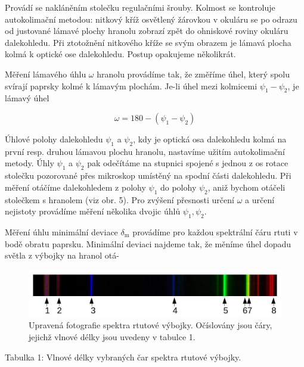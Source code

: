 \documentclass[czech,11pt,a4paper]{article}
\begin{document}
\begin{multicols}{2}
Provádí se nakláněním stolečku regulačními šrouby. Kolmost se kontroluje autokolimační metodou: nitkový kříž osvětlený žárovkou v okuláru se po odrazu od justované lámavé plochy hranolu zobrazí zpět do ohniskové roviny okuláru dalekohledu. Při ztotožnění nitkového kříže se svým obrazem je lámavá plocha kolmá k optické ose dalekohledu. Postup opakujeme několikrát.

Měření lámavého úhlu $\omega$ hranolu provádíme tak, že změříme úhel, který spolu svírají paprsky kolmé k lámavým plochám. Je-li úhel mezi kolmicemi $\psi_{1}-\psi_{2}$, je lámavý úhel

\begin{equation}
	\omega=180-\left(\psi_{1}-\psi_{2}\right)
\end{equation}


Úhlové polohy dalekohledu $\psi_{1}$ a $\psi_{2}$, kdy je optická osa dalekohledu kolmá na první resp. druhou lámavou plochu hranolu, nastavíme užitím autokolimační metody. Úhly $\psi_{1}$ a $\psi_{2}$ pak odečítáme na stupnici spojené s jednou z os rotace stolečku pozorované přes mikroskop umístěný na spodní části dalekohledu. Při měření otáčíme dalekohledem z polohy $\psi_{1}$ do polohy $\psi_{2}$, aniž bychom otáčeli stolečkem s hranolem (viz obr. 5). Pro zvýšení přesnosti určení $\omega$ a určení nejistoty provádíme měření několika dvojic úhlů $\psi_{1}, \psi_{2}$.

Měření úhlu minimální deviace $\delta_{\mathrm{m}}$ provádíme pro každou spektrální čáru rtuti v bodě obratu paprsku. Minimální deviaci najdeme tak, že měníme úhel dopadu světla z výbojky na hranol otá-\\

\begin{figure}[H]
	\includegraphics[max width=0.95\linewidth, center]{2024_12_03_db7ee7d12aab7219c185g-4}
	\caption{Upravená fotografie spektra rtutové výbojky. Očíslovány jsou čáry, jejichž vlnové délky jsou uvedeny v tabulce 1.}
\end{figure}



Tabulka 1: Vlnové délky vybraných čar spektra rtutové výbojky.


\end{multicols}
\end{document}
